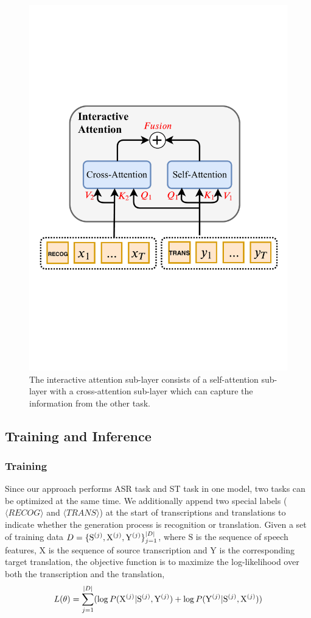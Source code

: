 \documentclass[letterpaper]{article} %
\begin{document}
\begin{figure}[t]
	\centering
	\includegraphics[width=0.9\columnwidth]{Interactivate_attention.pdf}
	\caption{The interactive attention sub-layer consists of a self-attention sub-layer with a cross-attention sub-layer which can capture the information from the other task.}
	\label{fig:interactivate_learning}
\end{figure}

\subsection{Training and Inference}
\subsubsection{Training}
Since our approach performs ASR task and ST task in one model, two tasks can be optimized at the same time. We additionally append two special labels ($\langle  RECOG\rangle$ and $\langle TRANS\rangle$) at the start of transcriptions and translations to indicate whether the generation process is recognition or translation.  Given a set of training data $\small{D=\{\mathrm{S}^{(j)},\mathrm{X}^{(j)},\mathrm{Y}^{(j)}\}_{j=1}^{|D|}}$, where $\mathrm{S}$ is the sequence of speech features, $\mathrm{X}$ is the sequence of source transcription and $\mathrm{Y}$ is the corresponding target translation, the objective function is to maximize the log-likelihood over both the transcription and the translation,
\begin{equation}
\small
L(\theta)=\sum_{j=1}^{|D|} (\log P(\mathrm{X}^{(j)}|\mathrm{S}^{(j)},\mathrm{Y}^{(j)}) + \log P(\mathrm{Y}^{(j)}|\mathrm{S}^{(j)},\mathrm{X}^{(j)}))
\end{equation}
\end{document}
